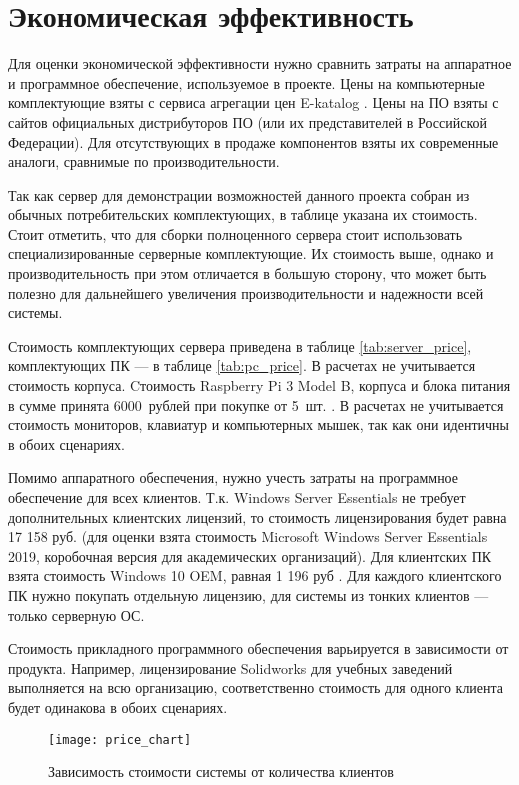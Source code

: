 \section{Экономическая эффективность}

Для оценки экономической эффективности нужно сравнить затраты на аппаратное и
программное обеспечение, используемое в проекте. Цены на компьютерные комплектующие
взяты с сервиса агрегации цен E-katalog \cite{ref:eeekatalog}. Цены на ПО взяты с сайтов
официальных дистрибуторов ПО (или их представителей в Российской Федерации).  Для
отсутствующих в продаже компонентов взяты их современные аналоги, сравнимые по
производительности.

Так как сервер для демонстрации возможностей данного проекта собран из обычных
потребительских комплектующих, в таблице указана их стоимость. Стоит отметить, что для
сборки полноценного сервера стоит использовать специализированные серверные 
комплектующие. Их стоимость выше, однако и производительность при этом отличается в
большую сторону, что может быть полезно для дальнейшего увеличения производительности и
надежности всей системы.

Стоимость комплектующих сервера приведена в таблице \ref{tab:server_price},
комплектующих ПК — в таблице \ref{tab:pc_price}. В расчетах не учитывается стоимость
корпуса. Cтоимость Raspberry Pi 3 Model B, корпуса и блока питания в сумме принята
6000~рублей при покупке от 5~шт. \cite{ref:raspberry_price}. В расчетах не учитывается
стоимость мониторов, клавиатур и компьютерных мышек, так как они идентичны в обоих
сценариях.

Помимо аппаратного обеспечения, нужно учесть затраты на программное обеспечение для всех
клиентов. Т.к. Windows Server Essentials не требует дополнительных клиентских лицензий,
то стоимость лицензирования будет равна 17 158 руб. (для оценки взята стоимость
Microsoft Windows Server Essentials 2019, коробочная версия для академических
организаций). Для клиентских ПК взята стоимость Windows 10 OEM, равная 1 196 руб
\cite{ref:windows_price}. Для каждого клиентского ПК нужно покупать отдельную лицензию,
для системы из тонких клиентов — только серверную ОС.

Стоимость прикладного программного обеспечения варьируется в зависимости от продукта.
Например, лицензирование Solidworks для учебных заведений выполняется на всю
организацию, соответственно стоимость для одного клиента будет одинакова в обоих
сценариях.

\begin{figure}[h]
    \center
    \texttt{[image: price\_chart]}
    \caption{Зависимость стоимости системы от количества клиентов}
    \label{pic:price_chart}
\end{figure}

